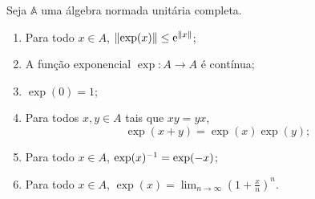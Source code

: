 \begin{proposition}
Seja $\mathbb A$ uma álgebra normada unitária completa.
	\begin{enumerate}
	\item Para todo $x \in A$, $\left\Vert{\exp(x)}\right\Vert \leq \mathrm{e}^{\left\Vert{x}\right\Vert}$;
	\item A função exponencial $\exp\colon A \to A$ é contínua;
	\item $\exp(0) = 1$;
	\item Para todos $x,y \in A$ tais que $xy=yx$,
		\begin{equation*}
		\exp(x+y) = \exp(x)\exp(y);
		\end{equation*}
	\item Para todo $x \in A$, $\exp(x)^{-1} = \exp(-x)$;
	\item Para todo $x \in A$, $\exp(x) = \lim_{n \to \infty} \left( 1 + \frac{x}{n} \right)^n$.
	\end{enumerate}
\end{proposition}
